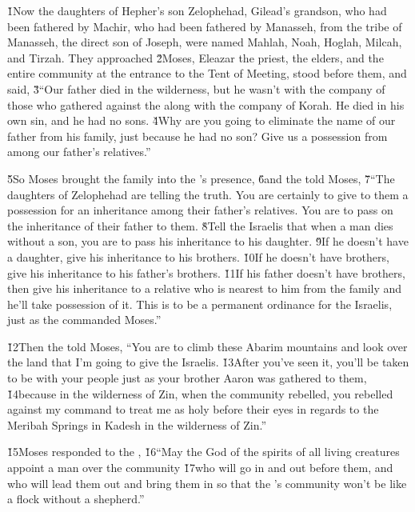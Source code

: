 \v{1}Now the daughters of Hepher's son Zelophehad, Gilead's grandson, who had been fathered by Machir, who had been fathered by Manasseh, from the tribe of Manasseh, the direct son of Joseph, were named Mahlah, Noah, Hoglah, Milcah, and Tirzah. They approached \v{2}Moses, Eleazar the priest, the elders, and the entire community at the entrance to the Tent of Meeting, stood before them, and said, \v{3}``Our father died in the wilderness, but he wasn't with the company of those who gathered against the  along with the company of Korah. He died in his own sin, and he had no sons. \v{4}Why are you going to eliminate the name of our father from his family, just because he had no son? Give us a possession from among our father's relatives.''

\v{5}So Moses brought the family into the 's presence, \v{6}and the  told Moses, \v{7}``The daughters of Zelophehad are telling the truth. You are certainly to give to them a possession for an inheritance among their father's relatives. You are to pass on the inheritance of their father to them. \v{8}Tell the Israelis that when a man dies without a son, you are to pass his inheritance to his daughter. \v{9}If he doesn't have a daughter, give his inheritance to his brothers. \v{10}If he doesn't have brothers, give his inheritance to his father's brothers. \v{11}If his father doesn't have brothers, then give his inheritance to a relative who is nearest to him from the family and he'll take possession of it. This is to be a permanent ordinance for the Israelis, just as the  commanded Moses.''

\v{12}Then the  told Moses, ``You are to climb these Abarim mountains and look over the land that I'm going to give the Israelis. \v{13}After you've seen it, you'll be taken to be with your people just as your brother Aaron was gathered to them, \v{14}because in the wilderness of Zin, when the community rebelled, you rebelled against my command to treat me as holy before their eyes in regards to the Meribah Springs in Kadesh in the wilderness of Zin.''

\v{15}Moses responded to the , \v{16}``May the  God of the spirits of all living creatures appoint a man over the community \v{17}who will go in and out before them, and who will lead them out and bring them in so that the 's community won't be like a flock without a shepherd.''

